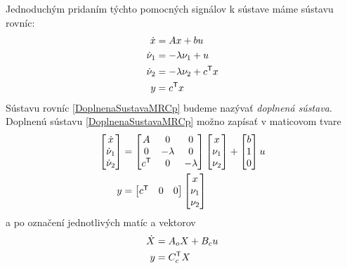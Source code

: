 \documentclass[a4paper, 10pt, ]{article}
\begin{document}
Jednoduchým pridaním týchto pomocných signálov k sústave máme sústavu rovníc:
\begin{subequations} \label{DoplnenaSustavaMRCp}
	\begin{align}
		 \dot x &= A x + b u \\
		 \dot \nu_1 &= -\lambda \nu_1 + u \\
		 \dot \nu_2 &= -\lambda \nu_2 + c^{\mathsf{T}} x \\
		 y &= c^{\mathsf{T}} x
	\end{align}
\end{subequations}
Sústavu rovníc \eqref{DoplnenaSustavaMRCp} budeme nazývať \emph{doplnená sústava}. Doplnenú sústavu \eqref{DoplnenaSustavaMRCp} možno zapísať v maticovom tvare
\begin{subequations}
	\begin{align}
		\begin{bmatrix} \dot x \\ \dot{\nu}_1 \\ \dot{\nu}_2 \end{bmatrix}
		&=
		\begin{bmatrix} A & 0 & 0 \\ 0 & -\lambda & 0 \\ c^{\mathsf{T}} & 0 & -\lambda \end{bmatrix}
	 	\begin{bmatrix} x \\ \nu_1 \\ \nu_2 \end{bmatrix}
		+
		\begin{bmatrix} b \\ 1\\ 0 \end{bmatrix}
	 	u
	 	\\
	 	y &= \begin{bmatrix} c^{\mathsf{T}} & 0 & 0 \end{bmatrix}
	 	\begin{bmatrix} x \\ \nu_1 \\ \nu_2 \end{bmatrix}
	\end{align}
\end{subequations}
a po označení jednotlivých matíc a vektorov
\begin{subequations}
\label{augmentedPlant}
	\begin{align}
		 \dot X &= A_o X + B_c u \\
		 y &= C_c^{\mathsf{T}} X \label{outputOfAugmentedPlant}
	\end{align}
\end{subequations}
\end{document}
